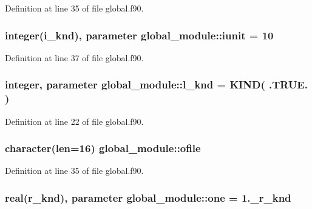 Definition at line 35 of file global.\-f90.

\hypertarget{classglobal__module_a734e710669b353233ba6b431d2b10a60}{
\subsubsection[{iunit}]{\setlength{\rightskip}{0pt plus 5cm}integer({\bf i\-\_\-knd}), parameter global\-\_\-module\-::iunit = 10}}\label{classglobal__module_a734e710669b353233ba6b431d2b10a60}


Definition at line 37 of file global.\-f90.

\hypertarget{classglobal__module_a968ba1aa6e3f1767b59bfb8bd310405e}{
\subsubsection[{l\-\_\-knd}]{\setlength{\rightskip}{0pt plus 5cm}integer, parameter global\-\_\-module\-::l\-\_\-knd = K\-I\-N\-D( .T\-R\-U\-E. )}}\label{classglobal__module_a968ba1aa6e3f1767b59bfb8bd310405e}


Definition at line 22 of file global.\-f90.

\hypertarget{classglobal__module_aa25a5f9ded0bd9460cc9a5c842a6812b}{
\subsubsection[{ofile}]{\setlength{\rightskip}{0pt plus 5cm}character(len=16) global\-\_\-module\-::ofile}}\label{classglobal__module_aa25a5f9ded0bd9460cc9a5c842a6812b}


Definition at line 35 of file global.\-f90.

\hypertarget{classglobal__module_ad2273c99f1e5fd95558f9217ed48f65f}{
\subsubsection[{one}]{\setlength{\rightskip}{0pt plus 5cm}real({\bf r\-\_\-knd}), parameter global\-\_\-module\-::one = 1.\-\_\-r\-\_\-knd}}\label{classglobal__module_ad2273c99f1e5fd95558f9217ed48f65f}



